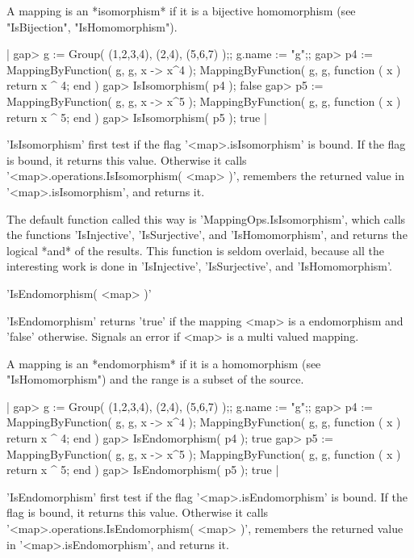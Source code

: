 A mapping is  an *isomorphism*  if  it  is a bijective homomorphism  (see
"IsBijection", "IsHomomorphism").

|    gap> g := Group( (1,2,3,4), (2,4), (5,6,7) );;  g.name := "g";;
    gap> p4 := MappingByFunction( g, g, x -> x^4 );
    MappingByFunction( g, g, function ( x )
        return x ^ 4;
    end )
    gap> IsIsomorphism( p4 );
    false
    gap> p5 := MappingByFunction( g, g, x -> x^5 );
    MappingByFunction( g, g, function ( x )
        return x ^ 5;
    end )
    gap> IsIsomorphism( p5 );
    true |

'IsIsomorphism' first test  if the flag  '<map>.isIsomorphism'  is bound.
If  the  flag  is bound,  it  returns this  value.   Otherwise  it  calls
'<map>.operations.IsIsomorphism(  <map> )', remembers  the returned value
in '<map>.isIsomorphism', and returns it.

The default function called this way is 'MappingOps.IsIsomorphism', which
calls the functions  'IsInjective', 'IsSurjective', and 'IsHomomorphism',
and  returns the logical *and*  of the results.  This  function is seldom
overlaid,  because  all the interesting work  is  done  in 'IsInjective',
'IsSurjective', and 'IsHomomorphism'.


'IsEndomorphism( <map> )'

'IsEndomorphism'  returns  'true' if the mapping <map> is a  endomorphism
and 'false' otherwise.   Signals an  error if  <map>  is a  multi  valued
mapping.

A   mapping   is  an  *endomorphism*  if  it   is   a  homomorphism  (see
"IsHomomorphism") and the range is a subset of the source.

|    gap> g := Group( (1,2,3,4), (2,4), (5,6,7) );;  g.name := "g";;
    gap> p4 := MappingByFunction( g, g, x -> x^4 );
    MappingByFunction( g, g, function ( x )
        return x ^ 4;
    end )
    gap> IsEndomorphism( p4 );
    true
    gap> p5 := MappingByFunction( g, g, x -> x^5 );
    MappingByFunction( g, g, function ( x )
        return x ^ 5;
    end )
    gap> IsEndomorphism( p5 );
    true |

'IsEndomorphism' first test if the flag  '<map>.isEndomorphism' is bound.
If  the  flag  is  bound,  it  returns this  value.   Otherwise  it calls
'<map>.operations.IsEndomorphism( <map> )', remembers  the returned value
in '<map>.isEndomorphism', and returns it.

